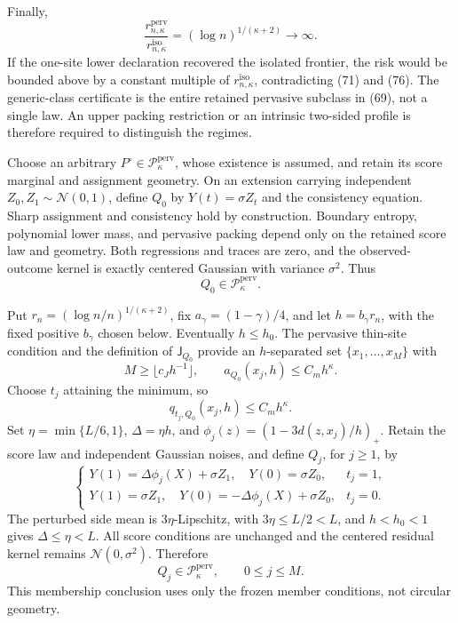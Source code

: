 Finally,
\[
 \frac{r_{n,\kappa}^{\mathrm{perv}}}{r_{n,\kappa}^{\mathrm{iso}}}
 =(\log n)^{1/(\kappa+2)}\longrightarrow\infty.
 \tag{76}
\]
If the one-site lower declaration recovered the isolated frontier, the
risk would be bounded above by a constant multiple of
\(r_{n,\kappa}^{\mathrm{iso}}\), contradicting (71) and (76).  The
generic-class certificate is the entire retained pervasive subclass in
(69), not a single law.  An upper packing restriction or an intrinsic
two-sided profile is therefore required to distinguish the regimes.

Choose an arbitrary \(P^\circ\in\mathcal P_{\kappa}^{\mathrm{perv}}\),
whose existence is assumed, and retain its score marginal and assignment
geometry.  On an extension carrying independent
\(Z_0,Z_1\sim\mathcal N(0,1)\), define \(Q_0\) by
\(Y(t)=\sigma Z_t\) and the consistency equation.  Sharp assignment and
consistency hold by construction.  Boundary entropy, polynomial lower
mass, and pervasive packing depend only on the retained score law and
geometry.  Both regressions and traces are zero, and the observed-outcome
kernel is exactly centered Gaussian with variance \(\sigma^2\).  Thus
\[
 Q_0\in\mathcal P_{\kappa}^{\mathrm{perv}}.
 \tag{77}
\]

Put \(r_n=(\log n/n)^{1/(\kappa+2)}\), fix
\(a_\gamma=(1-\gamma)/4\), and let \(h=b_\gamma r_n\), with the fixed
positive \(b_\gamma\) chosen below.  Eventually \(h\le h_0\).  The
pervasive thin-site condition and the definition of \(\mathsf J_{Q_0}\)
provide an \(h\)-separated set \(\{x_1,\ldots,x_M\}\) with
\[
 M\ge\lfloor c_Jh^{-1}\rfloor,
 \qquad a_{Q_0}(x_j,h)\le C_mh^\kappa.
 \tag{78}
\]
Choose \(t_j\) attaining the minimum, so
\[
 q_{t_j,Q_0}(x_j,h)\le C_mh^\kappa.
 \tag{79}
\]
Set \(\eta=\min\{L/6,1\}\), \(\Delta=\eta h\), and
\(\phi_j(z)=(1-3d(z,x_j)/h)_+\).  Retain the score law and independent
Gaussian noises, and define \(Q_j\), for \(j\ge1\), by
\[
 \begin{cases}
 Y(1)=\Delta\phi_j(X)+\sigma Z_1,\quad Y(0)=\sigma Z_0,&t_j=1,\\
 Y(1)=\sigma Z_1,\quad Y(0)=-\Delta\phi_j(X)+\sigma Z_0,&t_j=0.
 \end{cases}
 \tag{80}
\]
The perturbed side mean is \(3\eta\)-Lipschitz, with
\(3\eta\le L/2<L\), and \(h<h_0<1\) gives
\(\Delta\le\eta<L\).  All score conditions are unchanged and the
centered residual kernel remains \(\mathcal N(0,\sigma^2)\).  Therefore
\[
 Q_j\in\mathcal P_{\kappa}^{\mathrm{perv}},
 \qquad 0\le j\le M.
 \tag{81}
\]
This membership conclusion uses only the frozen member conditions, not
circular geometry.


